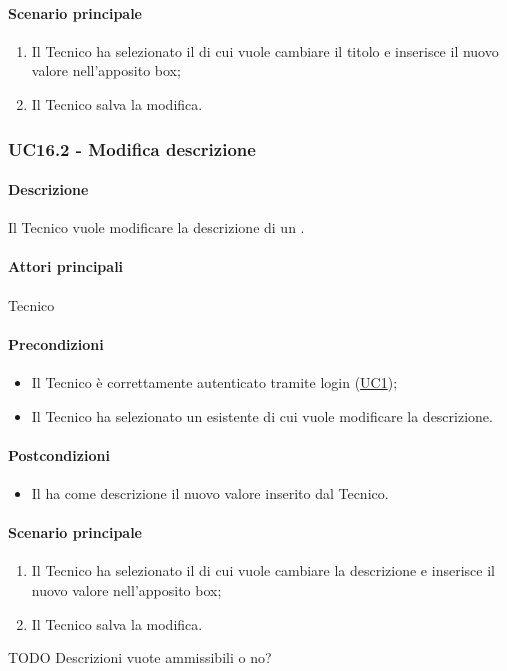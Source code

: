 \paragraph*{Scenario principale}
\begin{enumerate}
  \item Il Tecnico ha selezionato il  di cui vuole cambiare il titolo e inserisce il nuovo valore nell’apposito box;
  \item Il Tecnico salva la modifica.  
\end{enumerate}


\subsubsection{UC16.2 - Modifica descrizione }\label{UC16point2}
\paragraph*{Descrizione}
Il Tecnico vuole modificare la descrizione di un .

\paragraph*{Attori principali}
Tecnico

\paragraph*{Precondizioni}
\begin{itemize}
  \item Il Tecnico è correttamente autenticato tramite login (\hyperref[UC1]{UC1});
  \item Il Tecnico ha selezionato un  esistente di cui vuole modificare la descrizione.  
\end{itemize}

\paragraph*{Postcondizioni}
\begin{itemize}
  \item Il  ha come descrizione il nuovo valore inserito dal Tecnico.
\end{itemize}

\paragraph*{Scenario principale}
\begin{enumerate}
  \item Il Tecnico ha selezionato il  di cui vuole cambiare la descrizione e inserisce il nuovo valore nell’apposito box;
  \item Il Tecnico salva la modifica.
\end{enumerate}

TODO Descrizioni vuote ammissibili o no?
